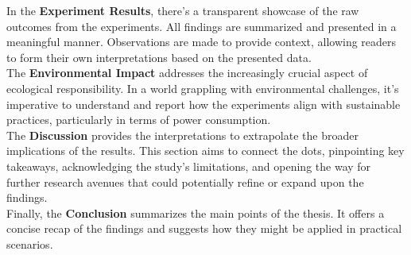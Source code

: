 In the \textbf{Experiment Results}, there's a transparent showcase of the raw outcomes from the experiments. All findings are summarized and presented in a meaningful manner. Observations are made to provide context, allowing readers to form their own interpretations based on the presented data.\\

The \textbf{Environmental Impact} addresses the increasingly crucial aspect of ecological responsibility. In a world grappling with environmental challenges, it's imperative to understand and report how the experiments align with sustainable practices, particularly in terms of power consumption.\\

The \textbf{Discussion} provides the interpretations to extrapolate the broader implications of the results. This section aims to connect the dots, pinpointing key takeaways, acknowledging the study's limitations, and opening the way for further research avenues that could potentially refine or expand upon the findings.\\

Finally, the \textbf{Conclusion} summarizes the main points of the thesis. It offers a concise recap of the findings and suggests how they might be applied in practical scenarios.







